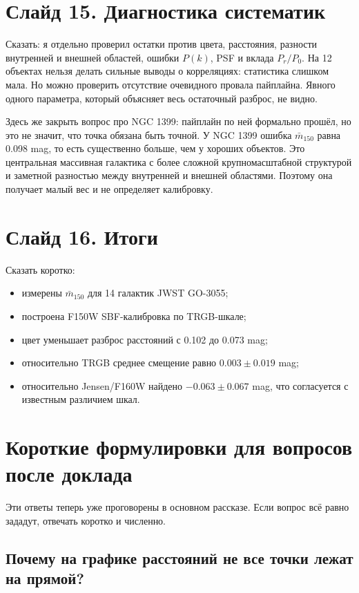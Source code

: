\documentclass[12pt]{article}
\begin{document}
\section*{Слайд 15. Диагностика систематик}

Сказать: я отдельно проверил остатки против цвета, расстояния, разности внутренней и внешней областей, ошибки $P(k)$, PSF и вклада $P_r/P_0$. На 12 объектах нельзя делать сильные выводы о корреляциях: статистика слишком мала. Но можно проверить отсутствие очевидного провала пайплайна. Явного одного параметра, который объясняет весь остаточный разброс, не видно.

Здесь же закрыть вопрос про NGC 1399: пайплайн по ней формально прошёл, но это не значит, что точка обязана быть точной. У NGC 1399 ошибка $\bar{m}_{150}$ равна 0.098 mag, то есть существенно больше, чем у хороших объектов. Это центральная массивная галактика с более сложной крупномасштабной структурой и заметной разностью между внутренней и внешней областями. Поэтому она получает малый вес и не определяет калибровку.

\section*{Слайд 16. Итоги}

Сказать коротко:
\begin{itemize}
    \item измерены $\bar{m}_{150}$ для 14 галактик JWST GO-3055;
    \item построена F150W SBF-калибровка по TRGB-шкале;
    \item цвет уменьшает разброс расстояний с 0.102 до 0.073 mag;
    \item относительно TRGB среднее смещение равно $0.003\pm0.019$ mag;
    \item относительно Jensen/F160W найдено $-0.063\pm0.067$ mag, что согласуется с известным различием шкал.
\end{itemize}

\section*{Короткие формулировки для вопросов после доклада}

Эти ответы теперь уже проговорены в основном рассказе. Если вопрос всё равно зададут, отвечать коротко и численно.

\subsection*{Почему на графике расстояний не все точки лежат на прямой?}
\end{document}
